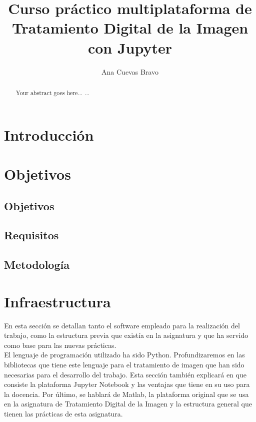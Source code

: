 \documentclass[a4paper,12pt]{report}
\begin{document}
\title{Curso práctico multiplataforma de Tratamiento Digital de la Imagen con Jupyter}
\author{ Ana Cuevas Bravo}
\maketitle

\newpage
{}

\renewcommand{\abstractname}{Resumen}
\renewcommand{\chaptername}{Capítulo}

\begin{abstract}
Your abstract goes here...
...
\end{abstract}


\tableofcontents
\newpage
{}

\chapter{Introducción}
\chapter{Objetivos}
\section{Objetivos}
\section{Requisitos}
\section{Metodología}
\chapter{Infraestructura}

En esta sección se detallan tanto el software empleado para la realización del trabajo, como la estructura previa que existía en la asignatura y que ha servido como base para las nuevas prácticas. \\

 El lenguaje de programación utilizado ha sido Python. Profundizaremos en las bibliotecas que tiene este lenguaje para el tratamiento de imagen que han sido necesarias para el desarrollo del trabajo. Esta sección también explicará en que consiste la plataforma Jupyter Notebook y las ventajas que tiene en su uso para la docencia. Por último, se hablará de Matlab, la plataforma original que se usa en la asignatura de Tratamiento Digital de la Imagen y la estructura general que tienen las prácticas de esta asignatura.
\end{document}
